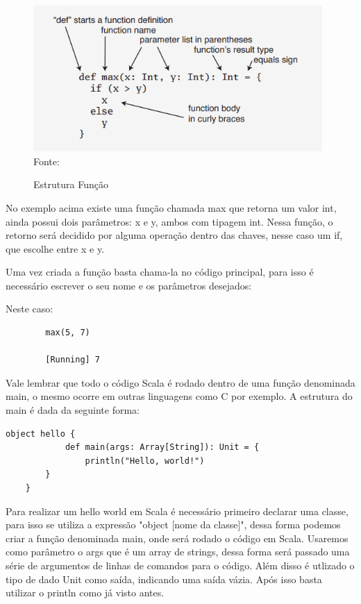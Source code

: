     \begin{figure}[H]
    	\centering
    	\caption{Estrutura Função}
    	\label{Estrutura Função}
    	\includegraphics[width=11cm]{func.png} \\
    	Fonte: \cite{Odersky}
    \end{figure}

	No exemplo acima existe uma função chamada max que retorna um valor int, ainda possui dois parâmetros: x e y, ambos com tipagem int. Nessa função, o retorno será decidido por alguma operação dentro das chaves, nesse caso um if, que escolhe entre x e y.
	
	Uma vez criada a função basta chama-la no código principal, para isso é necessário escrever o seu nome e os parâmetros desejados: 
	
	Neste caso:
	\begin{lstlisting}
		max(5, 7)
		
		[Running] 7
	\end{lstlisting}

	Vale lembrar que todo o código Scala é rodado dentro de uma função denominada main, o mesmo ocorre em outras linguagens como C por exemplo. A estrutura do main é dada da seguinte forma:
	
	\begin{lstlisting}[breaklines]
		object hello {
			def main(args: Array[String]): Unit = {
				println("Hello, world!")	
		}	
	}
	\end{lstlisting}
	
	Para realizar um hello world em Scala é necessário primeiro declarar uma classe, para isso se utiliza a expressão "object [nome da classe]", dessa forma podemos criar a função denominada main, onde será rodado o código em Scala. Usaremos como parâmetro o args que é um array de strings, dessa forma será passado uma série de argumentos de linhas de comandos para o código. Além disso é utlizado o tipo de dado Unit como saída, indicando uma saída vázia. Após isso basta utilizar o println como já visto antes.

